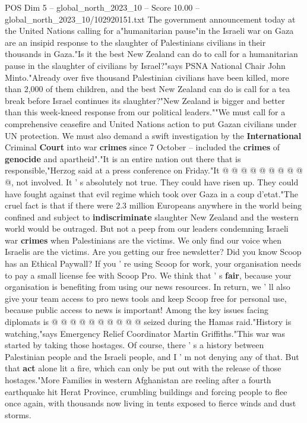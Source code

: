 \begin{textsample}{POS Dim 5 – global\_north\_2023\_10 – Score 10.00 – global\_north\_2023\_10/102920151.txt}  \label{ex:f5_pos_431}
The government announcement today at the United Nations calling for a"humanitarian pause"in the Israeli war on Gaza are an insipid response to the slaughter of Palestinians civilians in their thousands in Gaza."Is it the best New Zealand can do to call for a humanitarian pause in the slaughter of civilians by Israel?"says PSNA National Chair John Minto."Already over five thousand Palestinian civilians have been killed, more than 2,000 of them children, and the best New Zealand can do is call for a tea break before Israel continues its slaughter?"New Zealand is bigger and better than this week-kneed response from our political leaders.""We must call for a comprehensive ceasefire and United Nations action to put Gazan civilians under UN protection.
We must also demand a swift investigation by the \textbf{International} Criminal \textbf{Court} into war \textbf{crimes} since 7 October -- included the \textbf{crimes} of \textbf{genocide} and apartheid"."It is an entire nation out there that is responsible,"Herzog said at a press conference on Friday."It @ @ @ @ @ @ @ @ @ @, not involved.
It ' s absolutely not true.
They could have risen up.
They could have fought against that evil regime which took over Gaza in a coup d'etat."The cruel fact is that if there were 2.3 million Europeans anywhere in the world being confined and subject to \textbf{indiscriminate} slaughter New Zealand and the western world would be outraged.
But not a peep from our leaders condemning Israeli war \textbf{crimes} when Palestinians are the victims.
We only find our voice when Israelis are the victims.
Are you getting our free newsletter?
Did you know Scoop has an Ethical Paywall?
If you ' re using Scoop for work, your organisation needs to pay a small license fee with Scoop Pro.
We think that ' s \textbf{fair}, because your organisation is benefiting from using our news resources.
In return, we ' ll also give your team access to pro news tools and keep Scoop free for personal use, because public access to news is important!
Among the key issues facing diplomats is @ @ @ @ @ @ @ @ @ @ seized during the Hamas raid."History is watching,"says Emergency Relief Coordinator Martin Griffiths."This war was started by taking those hostages.
Of course, there ' s a history between Palestinian people and the Israeli people, and I ' m not denying any of that.
But that \textbf{act} alone lit a fire, which can only be put out with the release of those hostages."More Families in western Afghanistan are reeling after a fourth earthquake hit Herat Province, crumbling buildings and forcing people to flee once again, with thousands now living in tents exposed to fierce winds and dust storms.

\end{textsample}

